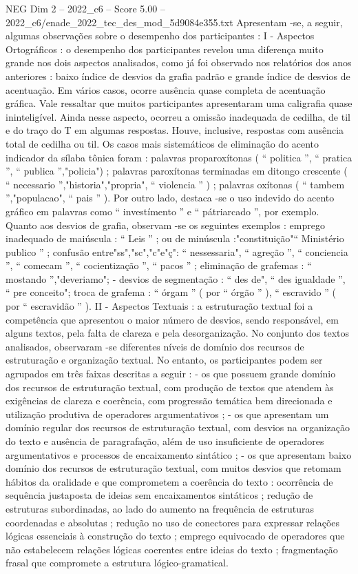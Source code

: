 \begin{textsample}{NEG Dim 2 – 2022\_c6 – Score 5.00 – 2022\_c6/enade\_2022\_tec\_des\_mod\_5d9084e355.txt}
Apresentam -se, a seguir, algumas observações sobre o desempenho dos participantes : I - Aspectos Ortográficos : o desempenho dos participantes revelou uma diferença muito grande nos dois aspectos analisados, como já foi observado nos relatórios dos anos anteriores : baixo índice de desvios da grafia padrão e grande índice de desvios de acentuação.
Em vários casos, ocorre ausência quase completa de acentuação gráfica.
Vale ressaltar que muitos participantes apresentaram uma caligrafia quase ininteligível.
Ainda nesse aspecto, ocorreu a omissão inadequada de cedilha, de til e do traço do T em algumas respostas.
Houve, inclusive, respostas com ausência total de cedilha ou til.
Os casos mais sistemáticos de eliminação do acento indicador da sílaba tônica foram : palavras proparoxítonas ( “ politica ”, “ pratica ”, “ publica ”,"policia") ; palavras paroxítonas terminadas em ditongo crescente ( “ necessario ”,"historia","propria", “ violencia ” ) ; palavras oxítonas ( “ tambem ”,"populacao", “ pais ” ).
Por outro lado, destaca -se o uso indevido do acento gráfico em palavras como “ investímento ” e “ pátriarcado ”, por exemplo.
Quanto aos desvios de grafia, observam -se os seguintes exemplos : emprego inadequado de maiúscula : “ Leis ” ; ou de minúscula :"constituição"“ Ministério publico ” ; confusão entre"ss","sc","c"e"ç": “ nessessaria", “ agreção ”, “ conciencia ”, “ comecam ”, “ cocientização ”, “ pacos ” ; eliminação de grafemas : “ mostando ”,"deveriamo"; - desvios de segmentação : “ des de", “ des igualdade ”, “ pre conceito"; troca de grafema : “ órgam ” ( por “ órgão ” ), “ escravido ” ( por “ escravidão ” ).
II - Aspectos Textuais : a estruturação textual foi a competência que apresentou o maior número de desvios, sendo responsável, em alguns textos, pela falta de clareza e pela desorganização.
No conjunto dos textos analisados, observaram -se diferentes níveis de domínio dos recursos de estruturação e organização textual.
No entanto, os participantes podem ser agrupados em três faixas descritas a seguir : - os que possuem grande domínio dos recursos de estruturação textual, com produção de textos que atendem às exigências de clareza e coerência, com progressão temática bem direcionada e utilização produtiva de operadores argumentativos ; - os que apresentam um domínio regular dos recursos de estruturação textual, com desvios na organização do texto e ausência de paragrafação, além de uso insuficiente de operadores argumentativos e processos de encaixamento sintático ; - os que apresentam baixo domínio dos recursos de estruturação textual, com muitos desvios que retomam hábitos da oralidade e que comprometem a coerência do texto : ocorrência de sequência justaposta de ideias sem encaixamentos sintáticos ; redução de estruturas subordinadas, ao lado do aumento na frequência de estruturas coordenadas e absolutas ; redução no uso de conectores para expressar relações lógicas essenciais à construção do texto ; emprego equivocado de operadores que não estabelecem relações lógicas coerentes entre ideias do texto ; fragmentação frasal que compromete a estrutura lógico-gramatical.

\end{textsample}
